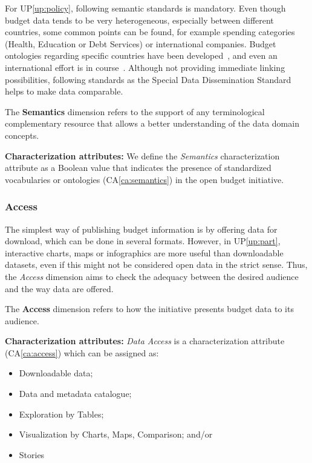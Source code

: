 For UP\ref{up:policy}, following semantic standards is mandatory.
Even though budget data tends to be very heterogeneous, especially between different countries, some common points can be found, for example spending categories (Health, Education or Debt Services) or international companies. 
Budget ontologies regarding specific countries have been developed~\cite{Santos2012, Reynolds2010}, and even an international effort is in course~\cite{OpenSpending}. 
Although not providing immediate linking possibilities, following standards as the Special Data Dissemination Standard~\cite{InternationalMonetaryFund2013} helps to make data comparable.

		\begin{defn}The \textbf{Semantics} dimension refers to the support of any terminological complementary resource that allows a better understanding of the data domain concepts.
		\end{defn}

		\noindent\textbf{Characterization attributes:}
We define the \emph{Semantics} characterization attribute as a Boolean value that indicates the presence of standardized vocabularies or ontologies (CA\ref{ca:semantics}) in the open budget initiative.

\vspace{.1cm}
	\subsubsection{Access}
The simplest way of publishing budget information is by offering data for download, which can be done in several formats. 
However, in UP\ref{up:part}, interactive charts, maps or infographics are more useful than downloadable datasets, even if this might not be considered open data in the strict sense.
Thus, the \emph{Access} dimension aims to check the adequacy between the desired audience and the way data are offered.

		\begin{defn}The \textbf{Access} dimension refers to how the initiative presents budget data to its audience.
		\end{defn}
		\noindent\textbf{Characterization attributes:}
\emph{Data Access} is a characterization attribute (CA\ref{ca:access}) which can be assigned as:
\begin{itemize}
	\item Downloadable data;
	\item Data and metadata catalogue;
	\item Exploration by Tables;
	\item Visualization by Charts, Maps, Comparison; and/or
	\item Stories
\end{itemize}

